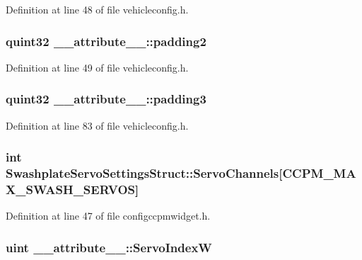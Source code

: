 \-Definition at line 48 of file vehicleconfig.\-h.

\hypertarget{group___config_plugin_ga445d386b31eb43aafbd971345a5b221e}{
\subsubsection[{padding2}]{\setlength{\rightskip}{0pt plus 5cm}quint32 {\bf \-\_\-\-\_\-attribute\-\_\-\-\_\-\-::padding2}}}\label{group___config_plugin_ga445d386b31eb43aafbd971345a5b221e}


\-Definition at line 49 of file vehicleconfig.\-h.

\hypertarget{group___config_plugin_gae95d6e80e1c87598f33d4be1b0a8c410}{
\subsubsection[{padding3}]{\setlength{\rightskip}{0pt plus 5cm}quint32 {\bf \-\_\-\-\_\-attribute\-\_\-\-\_\-\-::padding3}}}\label{group___config_plugin_gae95d6e80e1c87598f33d4be1b0a8c410}


\-Definition at line 83 of file vehicleconfig.\-h.

\hypertarget{group___config_plugin_ga86e55bfb2e22af5cf453931b3990d504}{
\subsubsection[{\-Servo\-Channels}]{\setlength{\rightskip}{0pt plus 5cm}int {\bf \-Swashplate\-Servo\-Settings\-Struct\-::\-Servo\-Channels}\mbox{[}\-C\-C\-P\-M\-\_\-\-M\-A\-X\-\_\-\-S\-W\-A\-S\-H\-\_\-\-S\-E\-R\-V\-O\-S\mbox{]}}}\label{group___config_plugin_ga86e55bfb2e22af5cf453931b3990d504}


\-Definition at line 47 of file configccpmwidget.\-h.

\hypertarget{group___config_plugin_gaffe6aa75cde814b5068ce3494b2abb34}{
\subsubsection[{\-Servo\-Index\-W}]{\setlength{\rightskip}{0pt plus 5cm}uint {\bf \-\_\-\-\_\-attribute\-\_\-\-\_\-\-::\-Servo\-Index\-W}}}\label{group___config_plugin_gaffe6aa75cde814b5068ce3494b2abb34}



